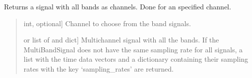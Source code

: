 \documentclass[letterpaper,10pt,english]{sphinxmanual}
\begin{document}
\begin{fulllineitems}
\begin{fulllineitems}
\label{\detokenize{classes:dsptoolbox.classes.multibandsignal.MultiBandSignal.get_all_bands}}
\pysigstartsignatures
{}
\pysigstopsignatures
\sphinxAtStartPar
Returns a signal with all bands as channels. Done for an specified
channel.
\begin{quote}\begin{description}
\begin{description}
\sphinxlineitem{\sphinxstylestrong{channel}}{[}int, optional{]}
\sphinxAtStartPar
Channel to choose from the band signals.

\end{description}

\begin{description}
\sphinxlineitem{\sphinxstylestrong{sig}}{[} or list of  and dict{]}
\sphinxAtStartPar
Multichannel signal with all the bands. If the MultiBandSignal
does not have the same sampling rate for all signals, a list with
the time data vectors and a dictionary containing their sampling
rates with the key ‘sampling\_rates’ are returned.

\end{description}

\end{description}\end{quote}

\end{fulllineitems}



\end{fulllineitems}
\end{document}
